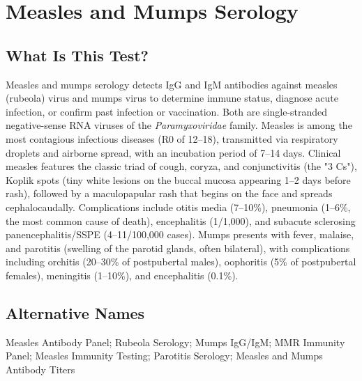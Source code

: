 \chapter{Measles and Mumps Serology}

\section*{What Is This Test?}
Measles and mumps serology detects IgG and IgM antibodies against measles (rubeola) virus and mumps virus to determine immune status, diagnose acute infection, or confirm past infection or vaccination. Both are single-stranded negative-sense RNA viruses of the \textit{Paramyxoviridae} family. Measles is among the most contagious infectious diseases (R0 of 12--18), transmitted via respiratory droplets and airborne spread, with an incubation period of 7--14 days. Clinical measles features the classic triad of cough, coryza, and conjunctivitis (the "3 Cs"), Koplik spots (tiny white lesions on the buccal mucosa appearing 1--2 days before rash), followed by a maculopapular rash that begins on the face and spreads cephalocaudally. Complications include otitis media (7--10\%), pneumonia (1--6\%, the most common cause of death), encephalitis (1/1,000), and subacute sclerosing panencephalitis/SSPE (4--11/100,000 cases). Mumps presents with fever, malaise, and parotitis (swelling of the parotid glands, often bilateral), with complications including orchitis (20--30\% of postpubertal males), oophoritis (5\% of postpubertal females), meningitis (1--10\%), and encephalitis (0.1\%).

\section*{Alternative Names}
Measles Antibody Panel; Rubeola Serology; Mumps IgG/IgM; MMR Immunity Panel; Measles Immunity Testing; Parotitis Serology; Measles and Mumps Antibody Titers


